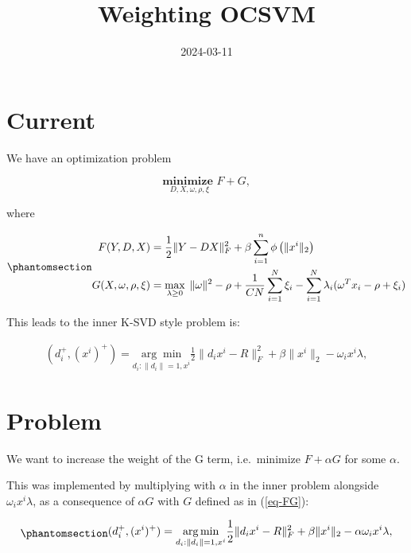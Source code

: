 \documentclass[
  letterpaper,
  DIV=11,
  numbers=noendperiod]{scrartcl}
\title{Weighting OCSVM}
\author{}
\date{2024-03-11}
\renewcommand*\contentsname{Table of contents}
\newcommand\contentsname{Table of contents}
\begin{document}
\maketitle

\renewcommand*\contentsname{Table of contents}
{
\hypersetup{linkcolor=}
\setcounter{tocdepth}{3}
\tableofcontents
}
\section{Current}\label{current}

We have an optimization problem

\[\underset{D, X, \omega, \rho, \xi}{\textbf{minimize  }} F + G,\]

where

\begin{equation}\phantomsection\label{eq-FG}{
\begin{align}
F(Y, D, X)  &= \frac12 \|Y - DX\|_F^2
  + \beta \sum_{i=1}^{n} \phi\left(\|x^i\|_2\right)  \\
G(X, \omega, \rho, \xi) &=\max\limits_{\lambda \ge 0} \; \|\omega\|^2 - \rho + \frac{1}{CN} \sum_{i=1}^{N} \xi_i
- \sum_{i=1}^{N} \lambda_i (\omega^T x_i - \rho + \xi_i)
\end{align}
}\end{equation}

This leads to the inner K-SVD style problem is:

\[
\begin{align}
(d^+_i,(x^i)^+) = \underset{d_i: \|d_i\|=1,x^i}{\arg\min} \frac12\|d_ix^i - R\|_F^2  + \beta\|x^i\|_2 - \omega_i x^i\lambda ,
\end{align}
\]

\section{Problem}\label{problem}

We want to increase the weight of the G term, i.e.~minimize
\(F + \alpha G\) for some \(\alpha\).

This was implemented by multiplying with \(\alpha\) in the inner problem
alongside \(\omega_i x^i \lambda\), as a consequence of \(\alpha G\)
with \(G\) defined as in (\ref{eq-FG}):

\begin{equation}\phantomsection\label{eq-inner}{
\begin{align}
(d^+_i,(x^i)^+) = \underset{d_i: \|d_i\|=1,x^i}{\arg\min} \frac12\|d_ix^i - R\|_F^2  + \beta\|x^i\|_2 - \alpha \omega_i x^i\lambda ,
\end{align}
}\end{equation}
\end{document}
